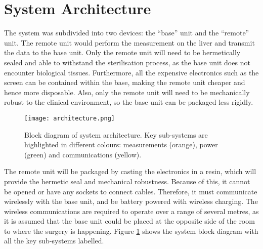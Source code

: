 \section{System Architecture}

The system was subdivided into two devices: the ``base'' unit and the ``remote'' unit. The remote unit would perform the measurement on the liver and transmit the data to the base unit. Only the remote unit will need to be hermetically sealed and able to withstand the sterilisation process, as the base unit does not encounter biological tissues. Furthermore, all the expensive electronics such as the screen can be contained within the base, making the remote unit cheaper and hence more disposable. Also, only the remote unit will need to be mechanically robust to the clinical environment, so the base unit can be packaged less rigidly. 


\begin{figure}[htbp]
	\centering
	\texttt{[image: architecture.png]}
	\caption{Block diagram of system architecture. Key sub-systems are highlighted in different colours: measurements (orange), power (green) and communications (yellow).}
	\label{fig: architecture}
\end{figure}

The remote unit will be packaged by casting the electronics in a resin, which will provide the hermetic seal and mechanical robustness. Because of this, it cannot be opened or have any sockets to connect cables. Therefore, it must communicate wirelessly with the base unit, and be battery powered with wireless charging. The wireless communications are required to operate over a range of several metres, as it is assumed that the base unit could be placed at the opposite side of the room to where the surgery is happening. Figure \ref{fig: architecture} shows the system block diagram with all the key sub-systems labelled.